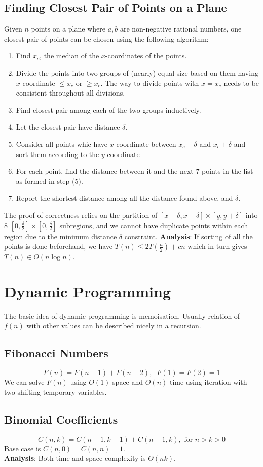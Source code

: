 \documentclass[12pt]{article}
\theoremstyle{definition}
\newcommand{\T}{\Theta}
\begin{document}
\subsection{Finding Closest Pair of Points on a Plane}
Given $n$ points on a plane where $a,b$ are non-negative rational numbers, one closest pair of points can be chosen using the following algorithm:
\begin{enumerate}
	\item Find $x_c$, the median of the $x$-coordinates of the points.
	\item Divide the points into two groups of (nearly) equal size based on them having $x$-coordinate $\leq x_c$ or $\geq x_c$. The way to divide points with $x=x_c$ needs to be consistent throughout all divisions.
	\item Find closest pair among each of the two groups inductively.
	\item Let the closest pair have distance $\delta$.
	\item Consider all points whic have $x$-coordinate between $x_c-\delta$ and $x_c+\delta$ and sort them according to the $y$-coordinate
	\item For each point, find the distance between it and the next $7$ points in the list as formed in step (5).
	\item Report the shortest distance among all the distance found above, and $\delta$.
\end{enumerate}
The proof of correctness relies on the partition of $[x-\delta, x+\delta]\times[y,y+\delta]$ into 8 $[0, \frac{\delta}{2}]\times [0, \frac{\delta}{2}]$ subregions, and we cannot have duplicate points within each region due to the minimum distance $\delta$ constraint.
\textbf{Analysis}: If sorting of all the points is done beforehand, we have $T(n)\leq 2T(\frac{n}{2})+cn$ which in turn gives $T(n)\in O(n\log n)$.
\clearpage
\section{Dynamic Programming}
The basic idea of dynamic programming is memoisation. Usually relation of $f(n)$ with other values can be described nicely in a recursion.
\subsection{Fibonacci Numbers}
\[
F(n)=F(n-1)+F(n-2), \;\;F(1)=F(2)=1
\]
We can solve $F(n)$ using $O(1)$ space and $O(n)$ time using iteration with two shifting temporary variables.
\subsection{Binomial Coefficients}
\[
C(n,k) = C(n-1, k-1)+C(n-1, k),\text{ for }n>k>0
\]
Base case is $C(n, 0) = C(n,n) = 1$.\\
\textbf{Analysis}: Both time and space complexity is $\T(nk)$.
\end{document}
